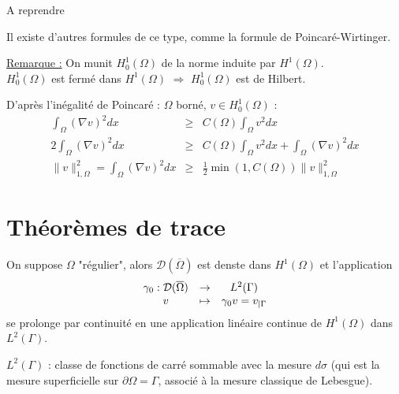
\begin{dem}
A reprendre
\end{dem}

Il existe d'autres formules de ce type, comme la formule de Poincaré-Wirtinger.

\bigskip
\underline{Remarque :} On munit $H_0^1(\Omega)$ de la norme induite par $H^1(\Omega)$.\\
$H_0^1(\Omega)$ est fermé dans $H^1(\Omega)$ $\Rightarrow$ $H_0^1(\Omega)$ est de Hilbert.


\begin{dem}
D'après l'inégalité de Poincaré : $\Omega$ borné, $v\in H_0^1(\Omega)$ :
\begin{eqnarray*}
	\int_{\Omega} (\nabla v)^2 dx &\geq& C(\Omega) \int_\Omega v^2 dx \\
	2\int_\Omega (\nabla v)^2 dx &\geq& C(\Omega) \int_\Omega v^2 dx + \int_\Omega (\nabla v)^2 dx \\
	\|v\|_{1,\Omega}^2 = \int_\Omega (\nabla v)^2 dx &\geq& \frac{1}{2} \min (1,C(\Omega)) \|v\|^2_{1,\Omega}
\end{eqnarray*}
\end{dem}

\section{Théorèmes de trace}
On suppose $\Omega$ "régulier", alors $\mathcal{D}(\overline{\Omega})$ est denste dans $H^1(\Omega)$ et l'application 
\[\begin{array}{c c c}\gamma_0 : \mathcal{D}(\overline{\Omega}) &\to& L^2(\Gamma) \\
					v			&\mapsto& \gamma_0 v = v_{|\Gamma} 
\end{array}\]
se prolonge par continuité en une application linéaire continue de $H^1(\Omega)$ dans $L^2(\Gamma)$.

\bigskip
$L^2(\Gamma)$ : classe de fonctions de carré sommable avec la mesure $d\sigma$ (qui est la mesure superficielle sur $\partial \Omega = \Gamma$, associé à la mesure classique de Lebesgue).

